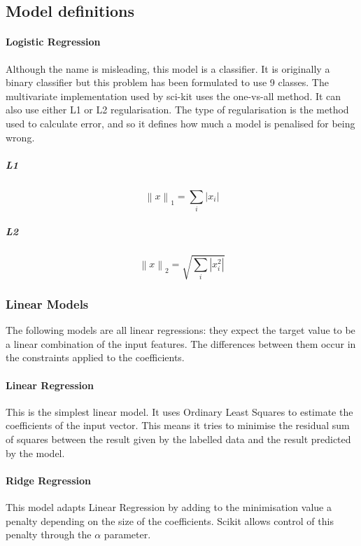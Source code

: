 \subsection{Model definitions}

\paragraph*{Logistic Regression}
Although the name is misleading, this model is a classifier. It is originally a binary classifier but this problem has been formulated to use 9 classes. The multivariate implementation used by sci-kit uses the one-vs-all method. It can also use either L1 or L2 regularisation. The type of regularisation is the method used to calculate error, and so it defines how much a model is penalised for being wrong.
\subparagraph*{L1}
\begin{displaymath}
\left \|x  \right \|_{1} = \sum_{i}^{ } \left |x_{i}\right |
\end{displaymath}

\subparagraph*{L2}
\begin{displaymath}
\left \|x  \right \|_{2} = \sqrt{\sum_{i} \left |x^{2}_{i}\right |}
\end{displaymath}

\subsubsection{Linear Models}
The following models are all linear regressions: they expect the target value to be a linear combination of the input features. The differences between them occur in the constraints applied to the coefficients.

\paragraph*{Linear Regression}
This is the simplest linear model. It uses Ordinary Least Squares to estimate the coefficients of the input vector. This means it tries to minimise the residual sum of squares between the result given by the labelled data and the result predicted by the model.

\paragraph*{Ridge Regression}
This model adapts Linear Regression by adding to the minimisation value a penalty depending on the size of the coefficients. Scikit allows control of this penalty through the $\alpha$ parameter.

